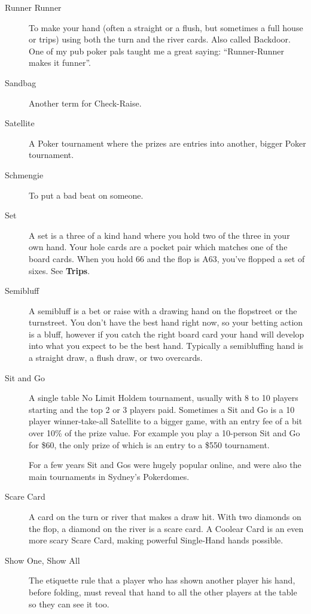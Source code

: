 \begin{description}
\item[Runner Runner] To make your hand (often a straight or a flush,
but sometimes a full house or trips) using both the turn and the
river cards. Also called Backdoor. One of my pub poker pals taught me
a great saying: ``Runner-Runner makes it funner''.

\item[Sandbag] Another term for Check-Raise.

\item[Satellite] A Poker tournament where the prizes are entries into
another, bigger Poker tournament.

\item[Schmengie] To put a bad beat on someone.

\item[Set] A set is a three of a kind hand where you hold two of the
three in your own hand. Your hole cards are a pocket pair which
matches one of the board cards. When you hold 66 and the flop is A63,
you've flopped a set of sixes. See \textbf{Trips}.

\item[Semibluff] A semibluff is a bet or raise with a drawing hand on
the flopstreet or the turnstreet. You don't have the best hand right
now, so your betting action is a bluff, however if you catch the right
board card your hand will develop into what you expect to be the best
hand. Typically a semibluffing hand is a straight draw, a flush draw,
or two overcards.

\item[Sit and Go] A single table No Limit Holdem tournament, usually
with 8 to 10 players starting and the top 2 or 3 players
paid. Sometimes a Sit and Go is a 10 player winner-take-all
Satellite to a bigger game, with an entry fee of a
bit over 10\% of the prize value. For example you play a 10-person
Sit and Go for \$60, the only prize of which is an entry to a \$550
tournament.

For a few years Sit and Gos were hugely popular online, and were also
the main tournaments in Sydney's Pokerdomes.

\item[Scare Card] A card on the turn or river that makes a draw hit.
With two diamonds on the flop, a diamond on the river is a scare card.
A Coolear Card is an even more scary Scare Card, making powerful
Single-Hand hands possible.

\item[Show One, Show All] The etiquette rule that a player who has
shown another player his hand, before folding, must reveal that hand
to all the other players at the table so they can see it too.


\end{description}
